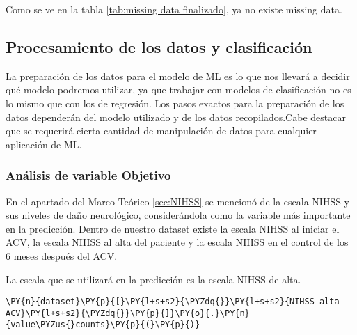     Como se ve en la tabla \ref{tab:missing data finalizado}, ya no existe missing data.

    \hypertarget{preprocesamiento-de-los-datos-y-clasificaciuxf3n}{%
\subsection{Procesamiento de los datos y clasificación}\label{preprocesamiento-de-los-datos-y-clasificaciuxf3n}}

La preparación de los datos para el modelo de ML es lo que nos llevará a decidir qué modelo podremos utilizar, ya que trabajar con modelos de clasificación no es lo mismo que con los de regresión. Los pasos exactos para la preparación de los datos dependerán del modelo utilizado y de los datos recopilados.Cabe destacar que se requerirá cierta cantidad de manipulación de datos para cualquier aplicación de ML.

    \hypertarget{anuxe1lisis-de-variable-objetivo}{%
\subsubsection{Análisis de variable Objetivo}\label{anuxe1lisis-de-variable-objetivo}}

	En el apartado del Marco Teórico \ref{sec:NIHSS} se mencionó de la escala NIHSS y sus niveles de daño neurológico, considerándola como la variable más importante en la predicción. Dentro de nuestro dataset existe la escala NIHSS al iniciar el ACV, la escala NIHSS al alta del paciente y la escala NIHSS en el control de los 6 meses después del ACV.
\par La escala que se utilizará en la predicción es la escala NIHSS de alta.

    \begin{tcolorbox}[breakable, size=fbox, boxrule=1pt, pad at break*=1mm,colback=cellbackground, colframe=cellborder]
\begin{Verbatim}[commandchars=\\\{\}]
\PY{n}{dataset}\PY{p}{[}\PY{l+s+s2}{\PYZdq{}}\PY{l+s+s2}{NIHSS alta ACV}\PY{l+s+s2}{\PYZdq{}}\PY{p}{]}\PY{o}{.}\PY{n}{value\PYZus{}counts}\PY{p}{(}\PY{p}{)}
\end{Verbatim}
\end{tcolorbox}

